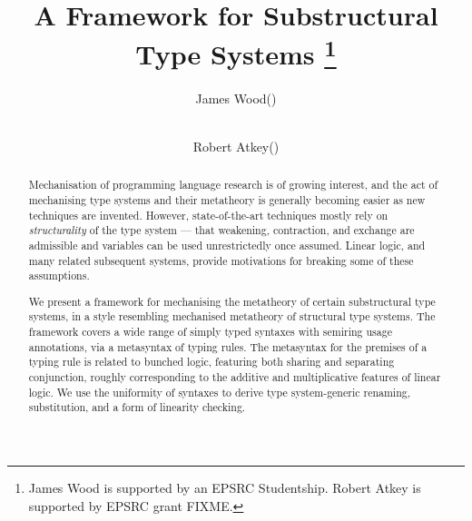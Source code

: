 \documentclass[runningheads]{llncs}
\begin{document}
%
\title{A Framework for Substructural Type Systems
  \thanks{James Wood is supported by an EPSRC Studentship. Robert Atkey is supported by EPSRC grant FIXME.}}
%
%
\author{James Wood(\Envelope) \and \\
  Robert Atkey(\Envelope)}
%
%
%
\maketitle              %
%
\begin{abstract}
  Mechanisation of programming language research is of growing interest, and
  the act of mechanising type systems and their metatheory is generally becoming
  easier as new techniques are invented.
  However, state-of-the-art techniques mostly rely on \emph{structurality} of
  the type system --- that weakening, contraction, and exchange are admissible
  and variables can be used unrestrictedly once assumed.
  Linear logic, and many related subsequent systems, provide motivations for
  breaking some of these assumptions.

  We present a framework for mechanising the metatheory of certain
  substructural type systems, in a style resembling mechanised metatheory of
  structural type systems.
  The framework covers a wide range of simply typed syntaxes with semiring
  usage annotations, via a metasyntax of typing rules.
  The metasyntax for the premises of a typing rule is related to bunched logic,
  featuring both sharing and separating conjunction, roughly corresponding to
  the additive and multiplicative features of linear logic.
  We use the uniformity of syntaxes to derive type system-generic renaming,
  substitution, and a form of linearity checking.

\end{abstract}
\end{document}
